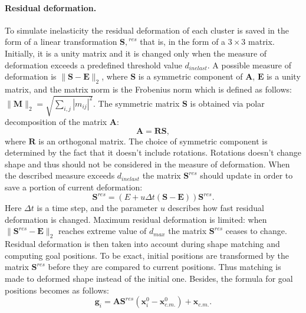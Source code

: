 \documentclass[a4paper, 12pt, titlepage]{extarticle}
\newcommand{\vect}[1]{\mathbf{#1}} %
\newcommand{\matx}[1]{\mathbf{#1}} %
\begin{document}
        \paragraph{Residual deformation.} To simulate inelasticity the residual deformation of each
        cluster is saved in the form of a linear transformation $\matx{S,}^{\!\!res}$ that is, in the
        form of a $3 \times 3$ matrix. Initially, it is a unity matrix and it is changed only when
        the measure of deformation exceeds a predefined threshold value $d_{inelast}$. A possible
        measure of deformation is $ \|\matx S - \matx E\|_2 $, where $\matx S$ is a symmetric
        component of $\matx A$, $\matx E$ is a unity matrix, and the matrix norm is the Frobenius
        norm which is defined as follows: $\|\matx M\|_2 = \sqrt{\sum_{i, j} |m_{ij}|^2}$. The
        symmetric matrix $\matx S$ is obtained via polar decomposition of the matrix $\matx A$:
        \begin{equation}\label{eq:polar_decomposition}
          \matx A = \matx R \matx S,
        \end{equation}
        where $\matx R$ is an orthogonal matrix. The choice of symmetric component is determined by
        the fact that it doesn't include rotations. Rotations doesn't change shape and thus should
        not be considered in the measure of deformation. When the described measure exceeds $d_{inelast}$
        the matrix $\matx{S}^{res}$ should update in order to save a portion of current deformation:
        \begin{equation}
          \matx{S}^{res} = \left(E + u \Delta t (\matx S - \matx E) \right) \matx{S}^{res}.
        \end{equation}
        Here $\Delta t$ is a time step, and the parameter $u$ describes how fast residual
        deformation is changed. Maximum residual deformation is limited: when
        $\|\matx{S}^{res} - \matx E\|_2$ reaches extreme value of $d_{max}$ the matrix
        $\matx{S}^{res}$ ceases to change. Residual deformation is then taken into account during
        shape matching and computing goal positions. To be exact, initial positions are transformed
        by the matrix $\matx{S}^{res}$ before they are compared to current positions. Thus
        matching is made to deformed shape instead of the initial one. Besides, the formula for goal
        positions becomes as follows:
        \begin{equation}\label{eq:goal_pos}
          \vect{g}_i = \matx{A} \matx{S}^{res} (\vect{x}^0_i - \vect{x}^0_{c.m.}) + \vect{x}_{c.m.}.
        \end{equation}
\end{document}
